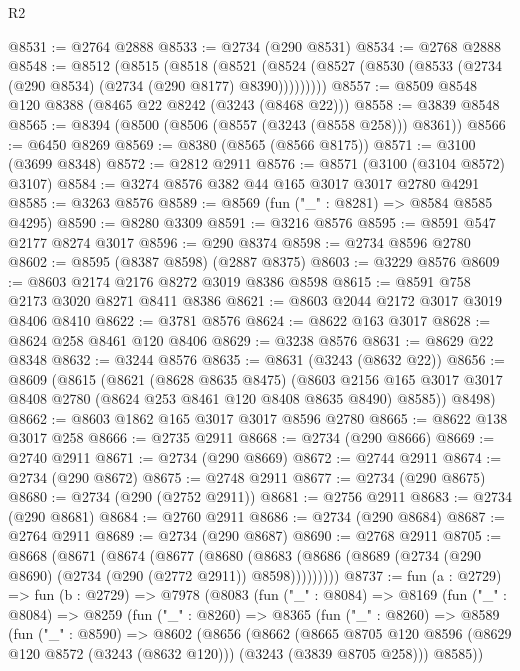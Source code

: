 \begin{lexlean}{R2}
\begin{coremodule}
@8531 := @2764 @2888
@8533 := @2734 (@290 @8531)
@8534 := @2768 @2888
@8548 := @8512
    (@8515
      (@8518
        (@8521 (@8524 (@8527 (@8530 (@8533 (@2734 (@290 @8534) (@2734 (@290 @8177) @8390)))))))))
@8557 := @8509 @8548 @120 @8388 (@8465 @22 @8242 (@3243 (@8468 @22)))
@8558 := @3839 @8548
@8565 := @8394 (@8500 (@8506 (@8557 (@3243 (@8558 @258))) @8361))
@8566 := @6450 @8269
@8569 := @8380 (@8565 (@8566 @8175))
@8571 := @3100 (@3699 @8348)
@8572 := @2812 @2911
@8576 := @8571 (@3100 (@3104 @8572) @3107)
@8584 := @3274 @8576 @382 @44 @165 @3017 @3017 @2780 @4291
@8585 := @3263 @8576
@8589 := @8569 (fun ("_" : @8281) => @8584 @8585 @4295)
@8590 := @8280 @3309
@8591 := @3216 @8576
@8595 := @8591 @547 @2177 @8274 @3017
@8596 := @290 @8374
@8598 := @2734 @8596 @2780
@8602 := @8595 (@8387 @8598) (@2887 @8375)
@8603 := @3229 @8576
@8609 := @8603 @2174 @2176 @8272 @3019 @8386 @8598
@8615 := @8591 @758 @2173 @3020 @8271 @8411 @8386
@8621 := @8603 @2044 @2172 @3017 @3019 @8406 @8410
@8622 := @3781 @8576
@8624 := @8622 @163 @3017
@8628 := @8624 @258 @8461 @120 @8406
@8629 := @3238 @8576
@8631 := @8629 @22 @8348
@8632 := @3244 @8576
@8635 := @8631 (@3243 (@8632 @22))
@8656 := @8609
    (@8615
      (@8621
        (@8628 @8635 @8475)
        (@8603 @2156 @165 @3017 @3017 @8408 @2780 (@8624 @253 @8461 @120 @8408 @8635 @8490) @8585))
      @8498)
@8662 := @8603 @1862 @165 @3017 @3017 @8596 @2780
@8665 := @8622 @138 @3017 @258
@8666 := @2735 @2911
@8668 := @2734 (@290 @8666)
@8669 := @2740 @2911
@8671 := @2734 (@290 @8669)
@8672 := @2744 @2911
@8674 := @2734 (@290 @8672)
@8675 := @2748 @2911
@8677 := @2734 (@290 @8675)
@8680 := @2734 (@290 (@2752 @2911))
@8681 := @2756 @2911
@8683 := @2734 (@290 @8681)
@8684 := @2760 @2911
@8686 := @2734 (@290 @8684)
@8687 := @2764 @2911
@8689 := @2734 (@290 @8687)
@8690 := @2768 @2911
@8705 := @8668
    (@8671
      (@8674
        (@8677
          (@8680 (@8683 (@8686 (@8689 (@2734 (@290 @8690) (@2734 (@290 (@2772 @2911)) @8598)))))))))
@8737 := fun (a : @2729) =>
  fun (b : @2729) =>
  @7978
    (@8083
      (fun ("_" : @8084) =>
      @8169
        (fun ("_" : @8084) =>
        @8259
          (fun ("_" : @8260) =>
          @8365
            (fun ("_" : @8260) =>
            @8589
              (fun ("_" : @8590) =>
              @8602
                (@8656
                  (@8662
                    (@8665
                      @8705
                      @120
                      @8596
                      (@8629 @120 @8572 (@3243 (@8632 @120)))
                      (@3243 (@3839 @8705 @258)))
                    @8585))

\end{coremodule}
\end{lexlean}
